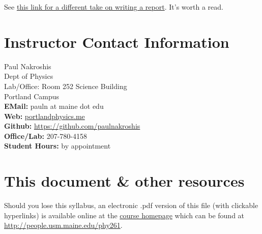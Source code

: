 \documentclass[justified]{tufte-handout}
\begin{document}
See \href{https://compphysics.github.io/ComputationalPhysicsMSU/doc/pub/projectwriting/html/projectwriting-bs.html}{this link for a different take on writing a report}. It's worth a read. 

\pagebreak
\section{Instructor Contact Information}
Paul Nakroshis\\
Dept of Physics\\
Lab/Office: Room 252 Science Building\\
Portland Campus\\
\hfill {\bf EMail:} {pauln at maine dot edu}\\
{\bf Web:} \href{portlandphysics.me}{portlandphysics.me}\\ 
{\bf Github:} \href{https://github.com/paulnakroshis}{https://github.com/paulnakroshis}\\
{\bf Office/Lab:} 207-780-4158\\
{\bf Student Hours:}  by appointment\\


\section{This document \& other resources}
 Should you lose this syllabus, an electronic .pdf version of this file (with clickable hyperlinks)  is available online at the \href{portlandphysics.me/phy261}{course homepage}  which can be found at \\ \href{portlandphysics.me/phy261}{http://people.usm.maine.edu/phy261}.\\
\end{document}
